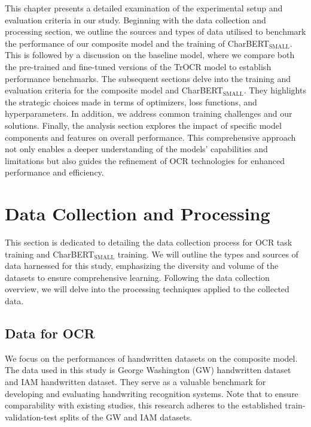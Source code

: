 \label{chap:4_experiment}
This chapter presents a detailed examination of the experimental setup and evaluation criteria in our study. Beginning with the data collection and processing section, we outline the sources and types of data utilised to benchmark the performance of our composite model and the training of CharBERT${_\text{SMALL}}$. This is followed by a discussion on the baseline model, where we compare both the pre-trained and fine-tuned versions of the TrOCR model to establish performance benchmarks. The subsequent sections delve into the training and evaluation criteria for the composite model and CharBERT${_\text{SMALL}}$. They highlights the strategic choices made in terms of optimizers, loss functions, and hyperparameters. In addition, we address common training challenges and our solutions. Finally, the analysis section explores the impact of specific model components and features on overall performance. This comprehensive approach not only enables a deeper understanding of the models' capabilities and limitations but also guides the refinement of OCR technologies for enhanced performance and efficiency.
\section{Data Collection and Processing}
\label{sec:3_data_collection_and_processing}
This section is dedicated to detailing the data collection process for OCR task training and CharBERT$_{\text{SMALL}}$ training. We will outline the types and sources of data harnessed for this study, emphasizing the diversity and volume of the datasets to ensure comprehensive learning. Following the data collection overview, we will delve into the processing techniques applied to the collected data.
\subsection{Data for OCR} 
\label{subsec:3_data_for_ocr}
We focus on the performances of handwritten datasets on the composite model. The data used in this study is George Washington (GW) handwritten dataset and IAM handwritten dataset. They serve as a valuable benchmark for developing and evaluating handwriting recognition systems. Note that to ensure comparability with existing studies, this research adheres to the established train-validation-test splits of the GW and IAM datasets. 

